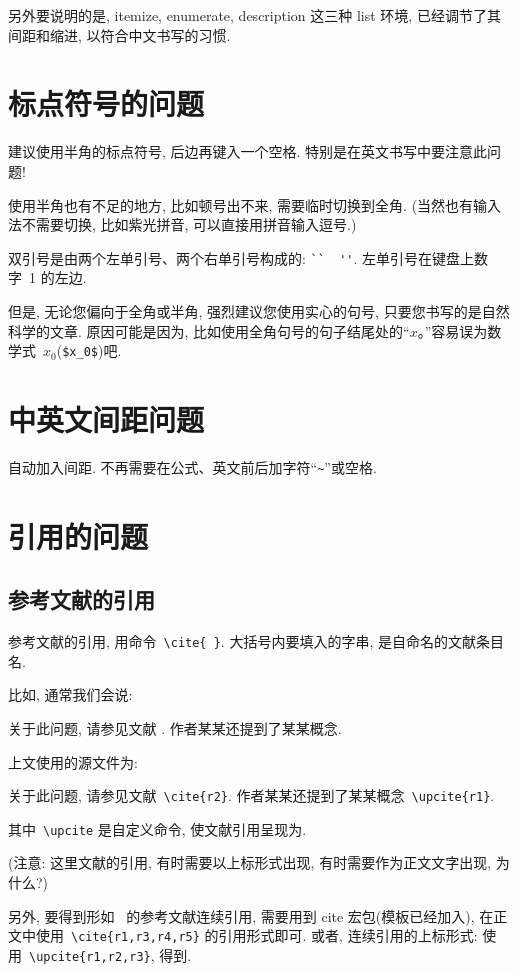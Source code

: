 \documentclass[forlib]{HDUMaster}   %
\begin{document}
另外要说明的是,  itemize, enumerate, description 这三种 list 环境, 已经调节了其间距和缩进,
以符合中文书写的习惯.

\section{标点符号的问题}

建议使用半角的标点符号, 后边再键入一个空格. 特别是在英文书写中要注意此问题!

使用半角也有不足的地方, 比如顿号出不来, 需要临时切换到全角. (当然也有输入法不需要切换, 比如紫光拼音, 可以直接用拼音输入逗号.)

双引号是由两个左单引号、两个右单引号构成的: \verb|``  ''|. 左单引号在键盘上数字~1 的左边.

但是, 无论您偏向于全角或半角, 强烈建议您使用实心的句号, 只要您书写的是自然科学的文章.
原因可能是因为, 比如使用全角句号的句子结尾处的``$x$。''容易误为数学式~$x_0$(\verb|$x_0$|)吧.

\section{中英文间距问题}

自动加入间距. 不再需要在公式、英文前后加字符``\verb|~|''或空格.

\section{引用的问题}


\subsection{参考文献的引用}

参考文献的引用, 用命令~\verb|\cite{ }|. 大括号内要填入的字串, 是自命名的文献条目名.

比如, 通常我们会说:

 {\kaishu
关于此问题, 请参见文献 \cite{r2}. 作者某某还提到了某某概念.}


上文使用的源文件为:

 {\kaishu
关于此问题, 请参见文献~\verb|\cite{r2}|. 作者某某还提到了某某概念~\verb|\upcite{r1}|.
}

其中~\verb|\upcite| 是自定义命令, 使文献引用呈现为.

({\heiti 注意:} {\kaishu 这里文献的引用, 有时需要以上标形式出现, 有时需要作为正文文字出现, 为什么?})

另外, 要得到形如~\cite{r1,r3,r4,r5} 的参考文献连续引用, 需要用到 cite 宏包(模板已经加入),
在正文中使用~\verb|\cite{r1,r3,r4,r5}| 的引用形式即可.
或者, 连续引用的上标形式: 使用~\verb|\upcite{r1,r2,r3}|, 得到.
\end{document}
